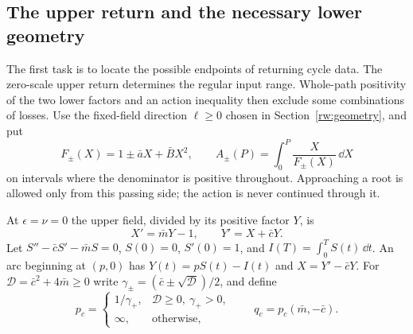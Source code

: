 \subsection{The upper return and the necessary lower geometry}
\label{rw:finite:geometry}

The first task is to locate the possible endpoints of returning cycle
data. The zero-scale upper return determines the regular input range.
Whole-path positivity of the two lower factors and an action inequality
then exclude some combinations of losses. Use the fixed-field direction
$\ell\ge0$ chosen in Section~\ref{rw:geometry}, and put
\[
 F_\pm(X)=1\pm\bar aX+\bar BX^2,\qquad
 A_\pm(P)=\int_0^P\frac{X}{F_\pm(X)}\,\dd X
\]
on intervals where the denominator is positive throughout. Approaching
a root is allowed only from this passing side; the action is never
continued through it.

At $\epsilon=\nu=0$ the upper field, divided by its positive factor
$Y$, is
\begin{equation}\label{rw:finite:principal-upper}
 X'=\bar mY-1,\qquad Y'=X+\bar cY.
\end{equation}
Let $S''-\bar cS'-\bar mS=0$, $S(0)=0$, $S'(0)=1$, and
$I(T)=\int_0^T S(t)\,\dd t$. An arc beginning at $(p,0)$ has
$Y(t)=pS(t)-I(t)$ and $X=Y'-\bar cY$.
For $\mathcal D=\bar c^2+4\bar m\ge0$ write
$\gamma_\pm=(\bar c\pm\sqrt{\mathcal D})/2$, and define
\[
 p_c=\begin{cases}1/\gamma_+,&\mathcal D\ge0,\ \gamma_+>0,\\
 \infty,&\text{otherwise},\end{cases}
 \qquad q_c=p_c(\bar m,-\bar c).
\]

